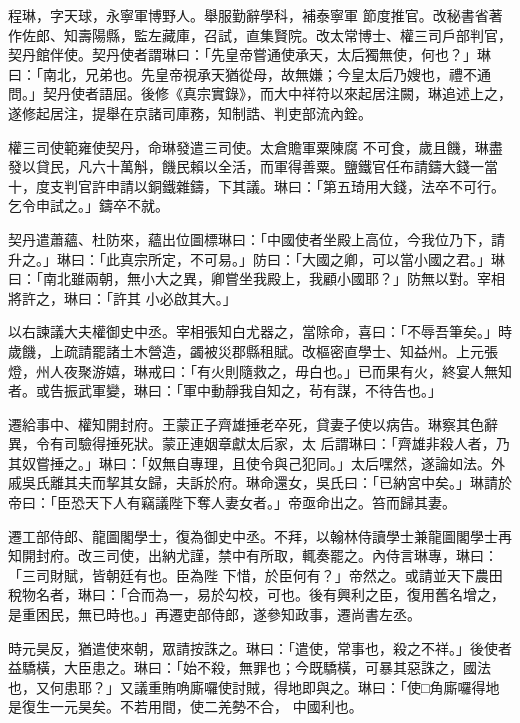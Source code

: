 \begin{pinyinscope}
 程琳，字天球，永寧軍博野人。舉服勤辭學科，補泰寧軍
 節度推官。改秘書省著作佐郎、知壽陽縣，監左藏庫，召試，直集賢院。改太常博士、權三司戶部判官，契丹館伴使。契丹使者謂琳曰：「先皇帝嘗通使承天，太后獨無使，何也？」琳曰：「南北，兄弟也。先皇帝視承天猶從母，故無嫌；今皇太后乃嫂也，禮不通問。」契丹使者語屈。後修《真宗實錄》，而大中祥符以來起居注闕，琳追述上之，遂修起居注，提舉在京諸司庫務，知制誥、判吏部流內銓。



 權三司使範雍使契丹，命琳發遣三司使。太倉贍軍粟陳腐
 不可食，歲且饑，琳盡發以貸民，凡六十萬斛，饑民賴以全活，而軍得善粟。鹽鐵官任布請鑄大錢一當十，度支判官許申請以銅鐵雜鑄，下其議。琳曰：「第五琦用大錢，法卒不可行。乞令申試之。」鑄卒不就。



 契丹遣蕭蘊、杜防來，蘊出位圖標琳曰：「中國使者坐殿上高位，今我位乃下，請升之。」琳曰：「此真宗所定，不可易。」防曰：「大國之卿，可以當小國之君。」琳曰：「南北雖兩朝，無小大之異，卿嘗坐我殿上，我顧小國耶？」防無以對。宰相將許之，琳曰：「許其
 小必啟其大。」



 以右諫議大夫權御史中丞。宰相張知白尤器之，當除命，喜曰：「不辱吾筆矣。」時歲饑，上疏請罷諸土木營造，蠲被災郡縣租賦。改樞密直學士、知益州。上元張燈，州人夜聚游嬉，琳戒曰：「有火則隨救之，毋白也。」已而果有火，終宴人無知者。或告振武軍變，琳曰：「軍中動靜我自知之，茍有謀，不待告也。」



 遷給事中、權知開封府。王蒙正子齊雄捶老卒死，貸妻子使以病告。琳察其色辭異，令有司驗得捶死狀。蒙正連姻章獻太后家，太
 后謂琳曰：「齊雄非殺人者，乃其奴嘗捶之。」琳曰：「奴無自專理，且使令與己犯同。」太后嘿然，遂論如法。外戚吳氏離其夫而挈其女歸，夫訴於府。琳命還女，吳氏曰：「已納宮中矣。」琳請於帝曰：「臣恐天下人有竊議陛下奪人妻女者。」帝亟命出之。笞而歸其妻。



 遷工部侍郎、龍圖閣學士，復為御史中丞。不拜，以翰林侍讀學士兼龍圖閣學士再知開封府。改三司使，出納尤謹，禁中有所取，輒奏罷之。內侍言琳專，琳曰：「三司財賦，皆朝廷有也。臣為陛
 下惜，於臣何有？」帝然之。或請並天下農田稅物名者，琳曰：「合而為一，易於勾校，可也。後有興利之臣，復用舊名增之，是重困民，無已時也。」再遷吏部侍郎，遂參知政事，遷尚書左丞。



 時元昊反，猶遣使來朝，眾請按誅之。琳曰：「遣使，常事也，殺之不祥。」後使者益驕橫，大臣患之。琳曰：「始不殺，無罪也；今既驕橫，可暴其惡誅之，國法也，又何患耶？」又議重賄唃廝囉使討賊，得地即與之。琳曰：「使□角廝囉得地是復生一元昊矣。不若用間，使二羌勢不合，
 中國利也。




\end{pinyinscope}

